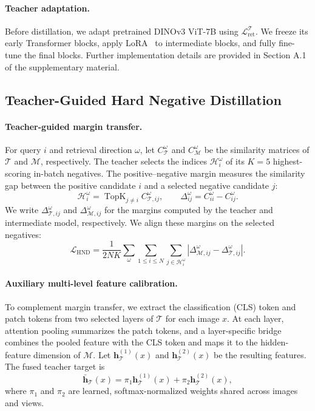 \paragraph{Teacher adaptation.}
Before distillation, we adapt pretrained DINOv3 ViT-7B
using $\mathcal{L}_{\mathrm{ret}}^{\mathcal{T}}$.
We freeze its early Transformer blocks, apply
LoRA~\cite{hu2022lora} to intermediate blocks, and
fully fine-tune the final blocks. Further implementation details are provided in Section A.1 of the supplementary material.

\subsection{Teacher-Guided Hard Negative Distillation}
\label{sec:tghnd}

\paragraph{Teacher-guided margin transfer.}
For query $i$ and retrieval direction $\omega$, let
$C_{\mathcal{T}}^\omega$ and
$C_{\mathcal{M}}^\omega$ be the similarity matrices of
$\mathcal{T}$ and $\mathcal{M}$, respectively. The teacher
selects the indices $\mathcal{H}_i^\omega$ of its $K=5$
highest-scoring in-batch negatives. The positive--negative
margin measures the similarity gap between the positive
candidate $i$ and a selected negative candidate $j$:
\begin{equation}
\mathcal{H}_i^\omega
=\operatorname{TopK}_{j\ne i}
C_{\mathcal{T},ij}^\omega,
\qquad
\Delta_{ij}^\omega
=C_{ii}^\omega-C_{ij}^\omega.
\label{eq:hnd_candidates_margins}
\end{equation}
We write $\Delta_{\mathcal{T},ij}^\omega$ and
$\Delta_{\mathcal{M},ij}^\omega$ for the margins computed
by the teacher and intermediate model, respectively.
We align these margins on the selected negatives:
\begin{equation}
\mathcal{L}_{\mathrm{HND}}
=\frac{1}{2NK}
\sum_{\omega}
\sum_{1\leq i\leq N}
\sum_{j\in\mathcal{H}_i^\omega}
\left|
\Delta_{\mathcal{M},ij}^\omega
-\Delta_{\mathcal{T},ij}^\omega
\right|.
\label{eq:hnd_loss}
\end{equation}

\paragraph{Auxiliary multi-level feature calibration.}
To complement margin transfer, we extract the
classification (CLS) token and patch tokens from two
selected layers of $\mathcal{T}$ for each image $x$.
At each layer, attention pooling summarizes the patch
tokens, and a layer-specific bridge combines the pooled
feature with the CLS token and maps it to the
hidden-feature dimension of $\mathcal{M}$. Let
$\mathbf{h}_{\mathcal{T}}^{(1)}(x)$ and
$\mathbf{h}_{\mathcal{T}}^{(2)}(x)$ be the resulting
features. The fused teacher target is
\[
\bar{\mathbf{h}}_{\mathcal{T}}(x)
=\pi_1\mathbf{h}_{\mathcal{T}}^{(1)}(x)
+\pi_2\mathbf{h}_{\mathcal{T}}^{(2)}(x),
\]
where $\pi_1$ and $\pi_2$ are learned, softmax-normalized
weights shared across images and views.

